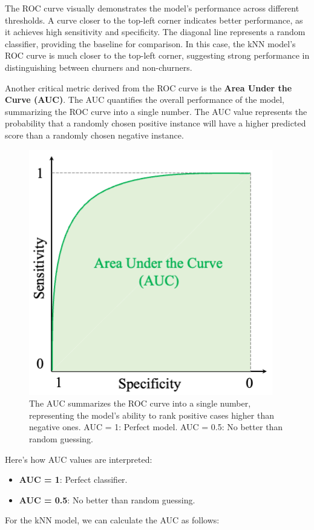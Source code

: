 \documentclass[
]{book}
\providecommand{\tightlist}{%
  \setlength{\itemsep}{0pt}\setlength{\parskip}{0pt}}
\theoremstyle{definition}
\theoremstyle{definition}
\theoremstyle{definition}
\theoremstyle{definition}
\theoremstyle{remark}
\begin{document}
The ROC curve visually demonstrates the model's performance across different thresholds. A curve closer to the top-left corner indicates better performance, as it achieves high sensitivity and specificity. The diagonal line represents a random classifier, providing the baseline for comparison. In this case, the kNN model's ROC curve is much closer to the top-left corner, suggesting strong performance in distinguishing between churners and non-churners.

Another critical metric derived from the ROC curve is the \textbf{Area Under the Curve (AUC)}. The AUC quantifies the overall performance of the model, summarizing the ROC curve into a single number. The AUC value represents the probability that a randomly chosen positive instance will have a higher predicted score than a randomly chosen negative instance.

\begin{figure}

{\centering \includegraphics[width=0.45\linewidth]{images/auc} 

}

\caption{The AUC summarizes the ROC curve into a single number, representing the model’s ability to rank positive cases higher than negative ones. AUC = 1: Perfect model. AUC = 0.5: No better than random guessing.}\label{fig:auc}
\end{figure}

Here's how AUC values are interpreted:

\begin{itemize}
\tightlist
\item
  \textbf{AUC = 1}: Perfect classifier.\\
\item
  \textbf{AUC = 0.5}: No better than random guessing.
\end{itemize}

For the kNN model, we can calculate the AUC as follows:
\end{document}
